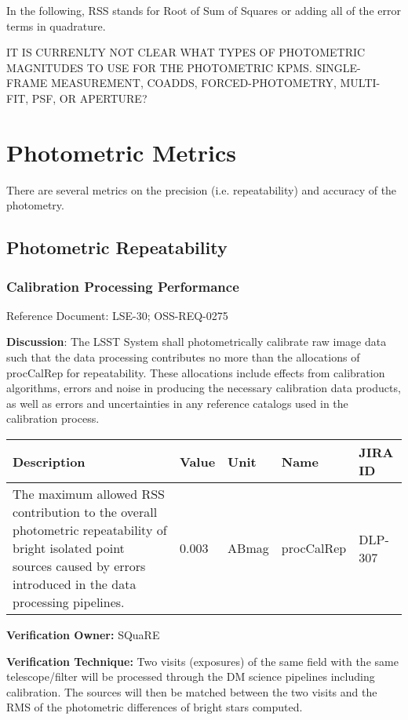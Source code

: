 In the following, RSS stands for Root of Sum of Squares or adding all of
the error terms in quadrature.

IT IS CURRENLTY NOT CLEAR WHAT TYPES OF PHOTOMETRIC MAGNITUDES TO USE
FOR THE PHOTOMETRIC KPMS. SINGLE-FRAME MEASUREMENT, COADDS,
FORCED-PHOTOMETRY, MULTI-FIT, PSF, OR APERTURE?

\section{Photometric Metrics}\label{photometric-metrics}

There are several metrics on the precision (i.e. repeatability) and
accuracy of the photometry.

\subsection{Photometric Repeatability}\label{photometric-repeatability}

\subsubsection{Calibration Processing
Performance}\label{calibration-processing-performance}

Reference Document: LSE-30; OSS-REQ-0275

\textbf{Discussion}: The LSST System shall photometrically calibrate raw
image data such that the data processing contributes no more than the
allocations of procCalRep for repeatability. These allocations include
effects from calibration algorithms, errors and noise in producing the
necessary calibration data products, as well as errors and uncertainties
in any reference catalogs used in the calibration process.

\begin{longtable}[]{@{}lllll@{}}
\toprule
Description & Value & Unit & Name & JIRA ID\tabularnewline
\midrule
\endhead
The maximum allowed RSS contribution to the overall photometric
repeatability of bright isolated point sources caused by errors
introduced in the data processing pipelines. & 0.003 & ABmag &
procCalRep & DLP-307\tabularnewline
\bottomrule
\end{longtable}

\textbf{Verification Owner:} SQuaRE

\textbf{Verification Technique:} Two visits (exposures) of the same
field with the same telescope/filter will be processed through the DM
science pipelines including calibration. The sources will then be
matched between the two visits and the RMS of the photometric
differences of bright stars computed.


